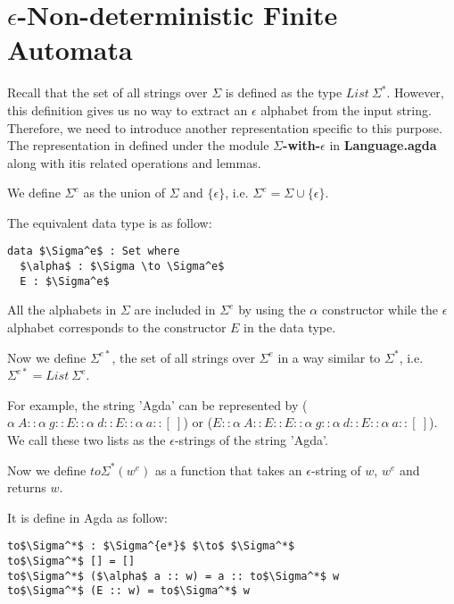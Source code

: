 \section{\(\epsilon\)-Non-deterministic Finite Automata}
\par Recall that the set of all strings over \(\Sigma\) is defined as
the type \(List\ \Sigma^*\). However, this definition gives us no way to
extract an \(\epsilon\) alphabet from the input string. Therefore,
we need to introduce another representation specific to this
purpose. The representation in defined under the module
\textbf{\(\Sigma\)-with-\(\epsilon\)} in \textbf{Language.agda} along
with itis related operations and lemmas. 

\begin{defn}
\noindent We define \(\Sigma^e\) as the union of
\(\Sigma\) and \(\{\epsilon\}\), i.e. \(\Sigma^e = \Sigma \cup \{\epsilon\}\).
\end{defn} 

\par The equivalent data type is as follow:
\begin{lstlisting}[mathescape=true,xleftmargin=.3\textwidth]
data $\Sigma^e$ : Set where
  $\alpha$ : $\Sigma \to \Sigma^e$
  E : $\Sigma^e$
\end{lstlisting}

\par All the alphabets in \(\Sigma\) are included in \(\Sigma^e\) by using the
\(\alpha\) constructor while the \(\epsilon\) alphabet corresponds to
the constructor \(E\) in the data type. 

\begin{defn}
\noindent Now we define \(\Sigma^{e*}\), the set of all strings over
\(\Sigma^e\) in a way similar to \(\Sigma^*\), i.e. \(\Sigma^{e*} =
List\ \Sigma^e\). 
\end{defn}

\par For example, the string 'Agda' can be
represented by (\(\alpha\ A :: \alpha\ g :: E :: \alpha\ d :: E :: \alpha\
a :: [\ ]\)) or (\(E :: \alpha\ A :: E :: E :: \alpha\ g :: \alpha\ d ::
E :: \alpha\ a :: [\ ]\)). We call these two lists as the \(\epsilon\)-strings of the
string 'Agda'. 

\begin{defn}
\noindent Now we define \(to\Sigma^*(w^e)\) as a function that takes an
\(\epsilon\)-string of \(w\), \(w^e\) and returns \(w\). 
\end{defn}

\par It is define in Agda as follow: 
\begin{lstlisting}[mathescape=true,xleftmargin=.3\textwidth]
to$\Sigma^*$ : $\Sigma^{e*}$ $\to$ $\Sigma^*$
to$\Sigma^*$ [] = []
to$\Sigma^*$ ($\alpha$ a :: w) = a :: to$\Sigma^*$ w
to$\Sigma^*$ (E :: w) = to$\Sigma^*$ w
\end{lstlisting}

